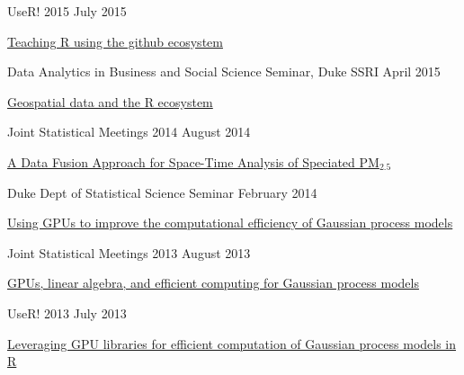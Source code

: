 \documentclass[margin,line]{res}
\begin{document}
\begin{resume}
UseR! 2015 \hfill July 2015
\begin{list1}
\item[] \href{https://github.com/rundel/Presentations/tree/master/UseR2015}{Teaching R using the github ecosystem}
\end{list1}
\vspace{-3mm}


Data Analytics in Business and Social Science Seminar, Duke SSRI \hfill April 2015
\begin{list1}
\item[] \href{https://github.com/rundel/Presentations/tree/master/Duke%202015%20-%20DABSS}{Geospatial data and the R ecosystem}
\end{list1}
\vspace{-3mm}

Joint Statistical Meetings 2014 \hfill August 2014
\begin{list1}
\item[] \href{https://github.com/rundel/Presentations/tree/master/JSM%202014}{A Data Fusion Approach for Space-Time Analysis of Speciated PM$_{2.5}$}
\end{list1}
\vspace{-3mm}

Duke Dept of Statistical Science Seminar \hfill February 2014
\begin{list1}
\item[] \href{https://github.com/rundel/Presentations/tree/master/Duke%202014}{Using GPUs to improve the computational efficiency of Gaussian process models}
\end{list1}
\vspace{-3mm}


Joint Statistical Meetings 2013 \hfill August 2013
\begin{list1}
\item[] \href{https://github.com/rundel/Presentations/tree/master/JSM%202013}{GPUs, linear algebra, and efficient computing for Gaussian process models}
\end{list1}
\vspace{-3mm}

UseR! 2013 \hfill July 2013
\begin{list1}
\item[] \href{https://github.com/rundel/Presentations/tree/master/UseR2013}{Leveraging GPU libraries for efficient computation of Gaussian process models in R}
\end{list1}
\vspace{-3mm}


\end{resume}
\end{document}
